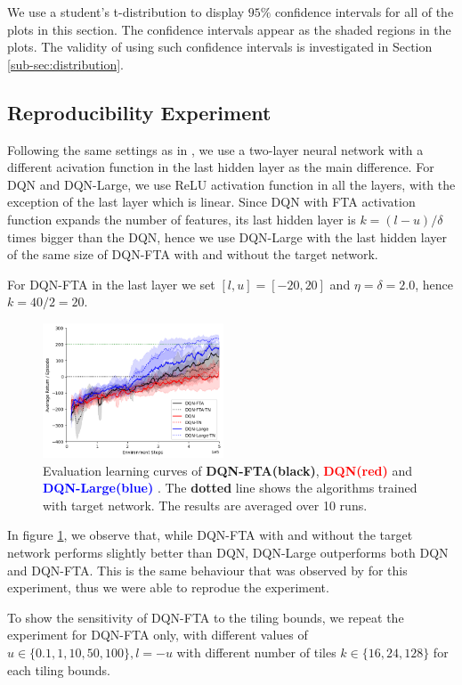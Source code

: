 \documentclass{article}
\begin{document}
We use a student's t-distribution to display $95\%$ confidence intervals for all of the plots in this section. 
The confidence intervals appear as the shaded regions in the plots.
The validity of using such confidence intervals is investigated in Section \ref{sub-sec:distribution}.


\subsection{Reproducibility Experiment} \label{sub-sec:reproduc experiments}
Following the same settings as in \cite{pan2019fuzzy}, we use a two-layer neural network with a different acivation function in the last hidden layer as the main difference. 
For DQN and DQN-Large, we use ReLU activation function in all the layers, with the exception of the last layer which is linear.
Since DQN with FTA activation function expands the number of features, its last hidden layer is $k = (l-u)/\delta$ times bigger than the DQN, 
hence we use DQN-Large with the last hidden layer of the same size of DQN-FTA with and without the target network.

For DQN-FTA in the last layer we set $[l, u] = [-20, 20]$ and $\eta = \delta = 2.0$, hence $k = 40/2 = 20$.


\begin{figure}[h]
    \centering
    \includegraphics[height=4cm]{ftavrelu.png}
    \caption{Evaluation learning curves of {\bf DQN-FTA(black)}, {\textcolor{red} {\bf DQN(red)}} and {\textcolor{blue} {\bf DQN-Large(blue)} }. 
    The {\bf dotted} line shows the algorithms trained with target network. The results are averaged over 10 runs.}
    \label{fig:ftavrelu}
\end{figure}


In figure \ref{fig:ftavrelu}, we observe that, while DQN-FTA with and without the target network performs slightly better than DQN, DQN-Large outperforms both DQN and DQN-FTA.
This is the same behaviour that was observed by \cite[]{pan2019fuzzy} for this experiment, thus we were able to reprodue the experiment.

To show the sensitivity of DQN-FTA to the tiling bounds, we repeat the experiment for DQN-FTA only, with different values of $u \in \{0.1,1,10,50,100\}, 
l = -u$ with different number of tiles $k \in \{16, 24, 128\}$ for each tiling bounds.
\end{document}
